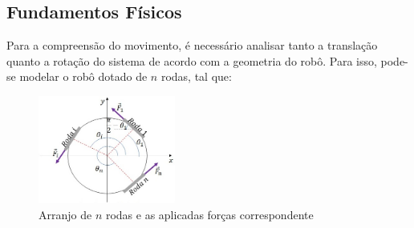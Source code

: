 \documentclass{article}
\begin{document}
\subsection{Fundamentos Físicos}

\hspace{1cm}Para a compreensão do movimento, é necessário analisar tanto a translação quanto a rotação do sistema de acordo com a geometria do robô. Para isso, pode-se modelar o robô dotado de $n$ rodas, tal que:

\begin{figure}[H]
\centering
\includegraphics[width=0.4\textwidth]{roda.jpeg}
\caption{Arranjo de $n$ rodas e as aplicadas forças correspondente}
\label{Rotulo}
\end{figure}
\end{document}
